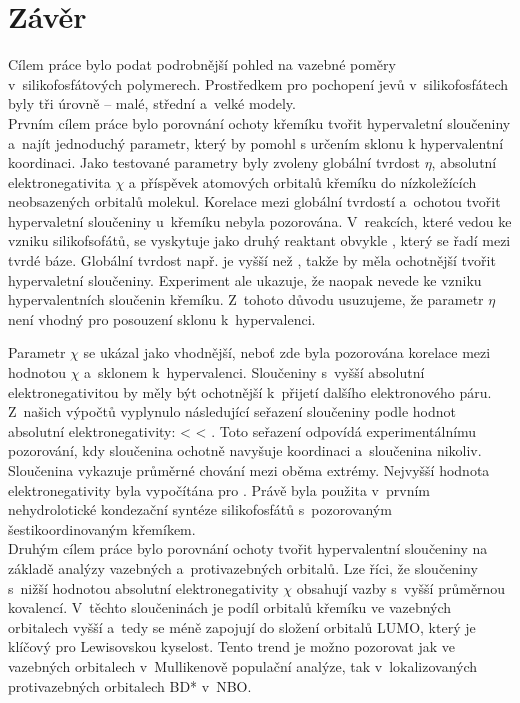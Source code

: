 \documentclass[
digital, %
table,   %
nolof,     %
nolot,     %
oneside,
]{fithesis3}
\begin{document}
\chapter{Závěr}
Cílem práce bylo podat podrobnější pohled na vazebné poměry v~silikofosfátových polymerech. Prostředkem pro pochopení jevů v~silikofosfátech byly tři úrovně -- malé, střední a~velké modely. \\

Prvním cílem práce bylo porovnání ochoty křemíku tvořit hypervaletní sloučeniny a~najít jednoduchý parametr, který by pomohl s určením sklonu k hypervalentní koordinaci. Jako testované parametry byly zvoleny globální tvrdost $\eta$, absolutní elektronegativita $\chi$ a příspěvek atomových orbitalů křemíku do nízkoležících neobsazených orbitalů molekul.
Korelace mezi globální tvrdostí a~ochotou tvořit hypervaletní sloučeniny u~křemíku nebyla pozorována. V~reakcích, které vedou ke vzniku silikofsofátů, se vyskytuje jako druhý reaktant obvykle , který se řadí mezi tvrdé báze. Globální tvrdost např.  je vyšší než , takže by měla ochotnější tvořit hypervaletní sloučeniny. Experiment ale ukazuje, že  naopak nevede ke vzniku hypervalentních sloučenin křemíku. Z~tohoto důvodu usuzujeme, že parametr $\eta$ není vhodný pro posouzení sklonu k~hypervalenci.

Parametr $\chi$ se ukázal jako vhodnější, neboť zde byla pozorována korelace mezi hodnotou $\chi$ a~sklonem k~hypervalenci. Sloučeniny s~vyšší absolutní elektronegativitou by měly být ochotnější k~přijetí dalšího elektronového páru. Z~našich výpočtů vyplynulo následující seřazení sloučeniny podle hodnot absolutní elektronegativity:  <  < . Toto seřazení odpovídá experimentálnímu pozorování, kdy sloučenina  ochotně navyšuje koordinaci a~sloučenina  nikoliv. Sloučenina  vykazuje průměrné chování mezi oběma extrémy. Nejvyšší hodnota elektronegativity byla vypočítána pro . Právě  byla použita v~prvním nehydrolotické kondezační syntéze silikofosfátů s~pozorovaným šestikoordinovaným křemíkem.\\

Druhým cílem práce bylo porovnání ochoty tvořit hypervalentní sloučeniny na základě analýzy vazebných a~protivazebných orbitalů. Lze říci, že sloučeniny s~nižší hodnotou absolutní elektronegativity $\chi$ obsahují vazby s~vyšší průměrnou kovalencí. V~těchto sloučeninách je podíl orbitalů křemíku ve vazebných orbitalech vyšší a~tedy se méně zapojují do složení orbitalů LUMO, který je klíčový pro Lewisovskou kyselost. Tento trend je možno pozorovat jak ve vazebných orbitalech v~Mullikenově populační analýze, tak v~lokalizovaných protivazebných orbitalech BD* v~NBO.\\
\end{document}
